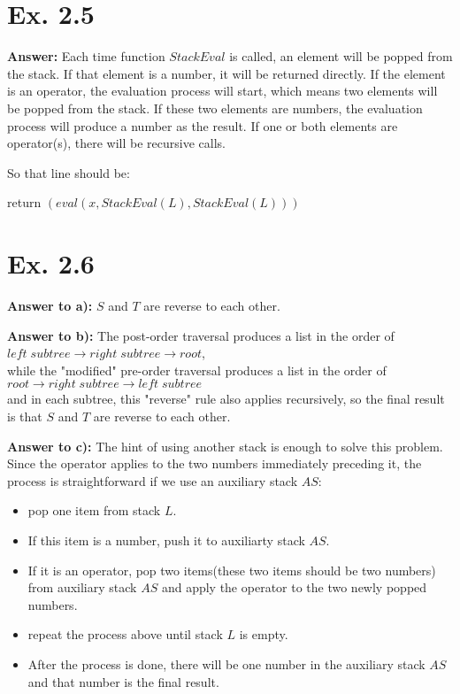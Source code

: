 \documentclass[a4paper,11pt]{article}
\theoremstyle{mytheor}
\begin{document}
\vspace{1.2in}

\section*{Ex. 2.5}
\noindent\textbf{Answer:} Each time function $StackEval$ is called, an element will be popped from the stack. If that element is a number, it will be returned directly. If the element is an operator, the evaluation process will start, which means two elements will be popped from the stack. If these two elements are numbers, the evaluation process will produce a number as the result. If one or both elements are operator(s), there will be recursive calls.

So that line should be:

return $(eval(x, StackEval(L), StackEval(L)))$
\vspace{1.2in}

\section*{Ex. 2.6}
\noindent\textbf{Answer to a):} $S$ and $T$ are reverse to each other. 

\vspace{1.2in}

\noindent\textbf{Answer to b):} The post-order traversal produces a list in the order of \\ $left\; subtree \rightarrow right\; subtree \rightarrow root$, \\while the "modified" pre-order traversal produces a list in the order of \\$root \rightarrow right\;subtree \rightarrow left\;subtree$ \\ and in each subtree, this "reverse" rule also applies recursively, so the final result is that $S$ and $T$ are reverse to each other.

\vspace{1.2in}

\noindent\textbf{Answer to c):} The hint of using another stack is enough to solve this problem. Since the operator applies to the two numbers immediately preceding it, the process is straightforward if we use an auxiliary stack $AS$:
\begin{itemize}
    \item pop one item from stack $L$. \item If this item is a number, push it to auxiliarty stack $AS$. \item If it is an operator, pop two items(these two items should be two numbers) from auxiliary stack $AS$ and apply the operator to the two newly popped numbers. \item repeat the process above until stack $L$ is empty. \item After the process is done, there will be one number in the auxiliary stack $AS$ and that number is the final result.
\end{itemize}
\end{document}
